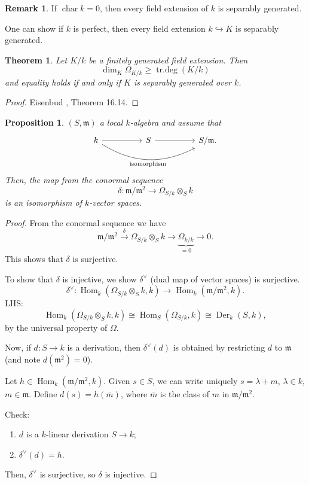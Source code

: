 \documentclass[12pt]{article}
\DeclareMathOperator{\Hom}{Hom}
\DeclareMathOperator{\chara}{char}
\DeclareMathOperator{\Der}{Der}
\DeclareMathOperator{\trdeg}{tr.deg}
\newtheorem*{proposition}{Proposition}
\newtheorem*{theorem}{Theorem}
\theoremstyle{definition}
\newtheorem*{remark}{Remark}
\begin{document}
\begin{remark}
If $\chara k=0$, then every field extension of $k$ is separably generated.

One can show if $k$ is perfect, then every field extension $k\hookrightarrow K$ is separably generated.
\end{remark}

\begin{theorem}
Let $K/k$ be a finitely generated field extension. Then
\[\dim_K\Omega_{K/k}\geq\trdeg(K/k)\]
and equality holds if and only if $K$ is separably generated over $k$.
\end{theorem}

\begin{proof}
Eisenbud \cite{eisenbud2013commutative}, Theorem 16.14.
\end{proof}

\begin{proposition}
$(S,\mathfrak{m})$ a local $k$-algebra and assume that
\[
\begin{tikzcd}
k\arrow[rr]\arrow[rrrr,bend right,"\text{isomorphism}",swap]&&S\arrow[rr]&&S/\mathfrak{m}.
\end{tikzcd}
\]
Then, the map from the conormal sequence
\[\delta:\mathfrak{m}/\mathfrak{m}^2\longrightarrow\Omega_{S/k}\otimes_Sk\]
is an isomorphism of $k$-vector spaces.
\end{proposition}

\begin{proof}
From the conormal sequence we have
\[\mathfrak{m}/\mathfrak{m}^2\overset{\delta}{\longrightarrow}\Omega_{S/k}\otimes_Sk\longrightarrow\underbrace{\Omega_{k/k}}_{=0}\longrightarrow0.\]
This shows that $\delta$ is surjective.

To show that $\delta$ is injective, we show $\delta^{\vee}$ (dual map of vector spaces) is surjective.
\[\delta^{\vee}:\Hom_k(\Omega_{S/k}\otimes_Sk,k)\longrightarrow\Hom_k(\mathfrak{m}/\mathfrak{m}^2,k).\]
LHS:
\[\Hom_k(\Omega_{S/k}\otimes_Sk,k)\cong\Hom_S(\Omega_{S/k},k)\cong\Der_k(S,k),\]
by the universal property of $\Omega$.

Now, if $d:S\rightarrow k$ is a derivation, then $\delta^{\vee}(d)$ is obtained by restricting $d$ to $\mathfrak{m}$ (and note $d(\mathfrak{m}^2)=0$).

Let $h\in\Hom_k(\mathfrak{m}/\mathfrak{m}^2,k)$. Given $s\in S$, we can write uniquely $s=\lambda+m$, $\lambda\in k$, $m\in\mathfrak{m}$. Define $d(s)=h(\overline{m})$, where $\overline{m}$ is the class of $m$ in $\mathfrak{m}/\mathfrak{m}^2$.

Check:
\begin{enumerate}[label=\arabic*)]
\item $d$ is a $k$-linear derivation $S\rightarrow k$;
\item $\delta^{\vee}(d)=h.$
\end{enumerate}
Then, $\delta^{\vee}$ is surjective, so $\delta$ is injective.
\end{proof}
\end{document}
